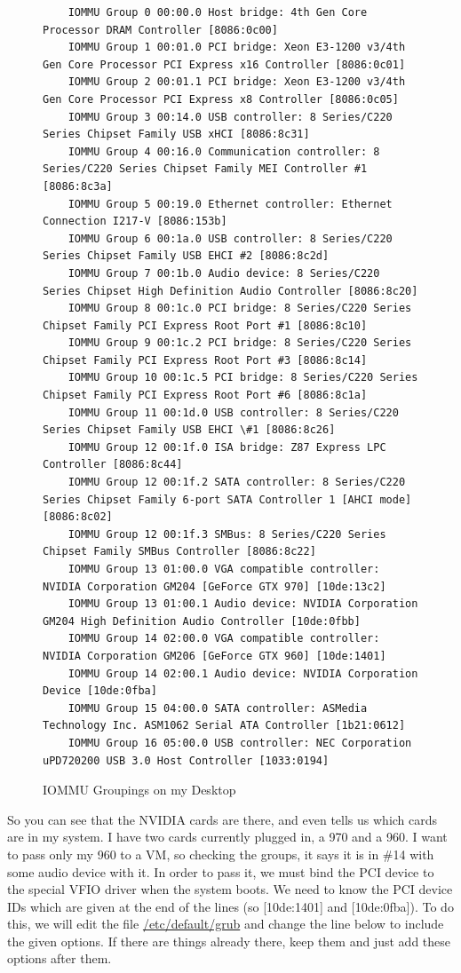 \documentclass[12pt]{article}
\begin{document}
\begin{figure}[ht]
	\scriptsize
	\begin{verbatim}
	IOMMU Group 0 00:00.0 Host bridge: 4th Gen Core Processor DRAM Controller [8086:0c00]
	IOMMU Group 1 00:01.0 PCI bridge: Xeon E3-1200 v3/4th Gen Core Processor PCI Express x16 Controller [8086:0c01]
	IOMMU Group 2 00:01.1 PCI bridge: Xeon E3-1200 v3/4th Gen Core Processor PCI Express x8 Controller [8086:0c05]
	IOMMU Group 3 00:14.0 USB controller: 8 Series/C220 Series Chipset Family USB xHCI [8086:8c31]
	IOMMU Group 4 00:16.0 Communication controller: 8 Series/C220 Series Chipset Family MEI Controller #1 [8086:8c3a]
	IOMMU Group 5 00:19.0 Ethernet controller: Ethernet Connection I217-V [8086:153b]
	IOMMU Group 6 00:1a.0 USB controller: 8 Series/C220 Series Chipset Family USB EHCI #2 [8086:8c2d]
	IOMMU Group 7 00:1b.0 Audio device: 8 Series/C220 Series Chipset High Definition Audio Controller [8086:8c20]
	IOMMU Group 8 00:1c.0 PCI bridge: 8 Series/C220 Series Chipset Family PCI Express Root Port #1 [8086:8c10]
	IOMMU Group 9 00:1c.2 PCI bridge: 8 Series/C220 Series Chipset Family PCI Express Root Port #3 [8086:8c14]
	IOMMU Group 10 00:1c.5 PCI bridge: 8 Series/C220 Series Chipset Family PCI Express Root Port #6 [8086:8c1a]
	IOMMU Group 11 00:1d.0 USB controller: 8 Series/C220 Series Chipset Family USB EHCI \#1 [8086:8c26]
	IOMMU Group 12 00:1f.0 ISA bridge: Z87 Express LPC Controller [8086:8c44]
	IOMMU Group 12 00:1f.2 SATA controller: 8 Series/C220 Series Chipset Family 6-port SATA Controller 1 [AHCI mode] [8086:8c02]
	IOMMU Group 12 00:1f.3 SMBus: 8 Series/C220 Series Chipset Family SMBus Controller [8086:8c22]
	IOMMU Group 13 01:00.0 VGA compatible controller: NVIDIA Corporation GM204 [GeForce GTX 970] [10de:13c2]
	IOMMU Group 13 01:00.1 Audio device: NVIDIA Corporation GM204 High Definition Audio Controller [10de:0fbb]
	IOMMU Group 14 02:00.0 VGA compatible controller: NVIDIA Corporation GM206 [GeForce GTX 960] [10de:1401]
	IOMMU Group 14 02:00.1 Audio device: NVIDIA Corporation Device [10de:0fba]
	IOMMU Group 15 04:00.0 SATA controller: ASMedia Technology Inc. ASM1062 Serial ATA Controller [1b21:0612]
	IOMMU Group 16 05:00.0 USB controller: NEC Corporation uPD720200 USB 3.0 Host Controller [1033:0194]
	\end{verbatim}
	\vspace{-20pt}
	\caption{IOMMU Groupings on my Desktop}
	\label{fig:iommu_output}
\end{figure}

So you can see that the NVIDIA cards are there, and even tells us which cards are in my system.
I have two cards currently plugged in, a 970 and a 960.
I want to pass only my 960 to a VM, so checking the groups, it says it is in \#14 with some audio device with it.
In order to pass it, we must bind the PCI device to the special VFIO driver when the system boots.
We need to know the PCI device IDs which are given at the end of the lines (so [10de:1401] and [10de:0fba]).
To do this, we will edit the file \underline{/etc/default/grub} and change the line below to include the given options.
If there are things already there, keep them and just add these options after them.
\end{document}
